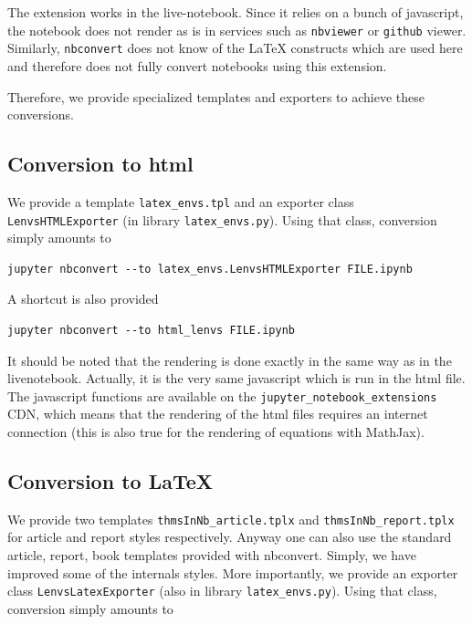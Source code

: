\documentclass[11pt]{article}
\begin{document}
    The extension works in the live-notebook. Since it relies on a bunch of
javascript, the notebook does not render as is in services such as
\texttt{nbviewer} or \texttt{github} viewer. Similarly,
\texttt{nbconvert} does not know of the LaTeX constructs which are used
here and therefore does not fully convert notebooks using this
extension.

Therefore, we provide specialized templates and exporters to achieve
these conversions.

    \subsection{Conversion to html}\label{conversion-to-html}

We provide a template \texttt{latex\_envs.tpl} and an exporter class
\texttt{LenvsHTMLExporter} (in library \texttt{latex\_envs.py}). Using
that class, conversion simply amounts to

\begin{verbatim}
jupyter nbconvert --to latex_envs.LenvsHTMLExporter FILE.ipynb
\end{verbatim}

A shortcut is also provided

\begin{verbatim}
jupyter nbconvert --to html_lenvs FILE.ipynb
\end{verbatim}

It should be noted that the rendering is done exactly in the same way as
in the livenotebook. Actually, it is the very same javascript which is
run in the html file. The javascript functions are available on the
\texttt{jupyter\_notebook\_extensions} CDN, which means that the
rendering of the html files requires an internet connection (this is
also true for the rendering of equations with MathJax).

\subsection{Conversion to LaTeX}\label{conversion-to-latex}

We provide two templates \texttt{thmsInNb\_article.tplx} and
\texttt{thmsInNb\_report.tplx} for article and report styles
respectively. Anyway one can also use the standard article, report, book
templates provided with nbconvert. Simply, we have improved some of the
internals styles. More importantly, we provide an exporter class
\texttt{LenvsLatexExporter} (also in library \texttt{latex\_envs.py}).
Using that class, conversion simply amounts to
\end{document}
